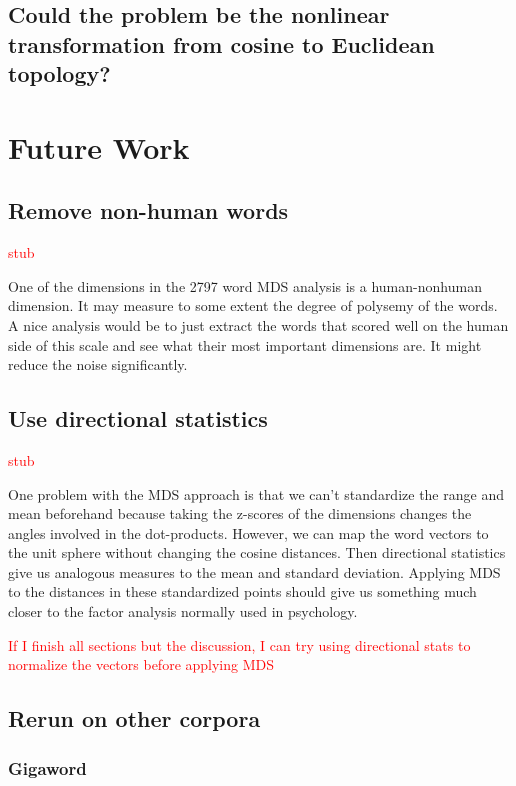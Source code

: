 \documentclass[10pt,letterpaper]{book}
\newcommand{\todo}[1]{\textcolor{red}{#1}}
\begin{document}
\section{Could the problem be the nonlinear transformation from cosine to Euclidean topology?}

\chapter{Future Work}

\section{Remove non-human words}

\todo{stub}

One of the dimensions in the 2797 word MDS analysis is a human-nonhuman 
dimension. It may measure to some extent the degree of polysemy of the words. A 
nice analysis would be to just extract the words that scored well on the human 
side of this scale and see what their most important dimensions are. It might 
reduce the noise significantly.

\section{Use directional statistics}

\todo{stub}

One problem with the MDS approach is that we can't standardize the range and 
mean beforehand because taking the z-scores of the dimensions changes the 
angles involved in the dot-products. However, we can map the word vectors to 
the unit sphere without changing the cosine distances. Then directional 
statistics give us analogous measures to the mean and standard deviation. 
Applying MDS to the distances in these standardized points should give us 
something much closer to the factor analysis normally used in psychology.

\todo{If I finish all sections but the discussion, I can try using directional 
stats to normalize the vectors before applying MDS}

\section{Rerun on other corpora}

\subsection{Gigaword}
\end{document}
